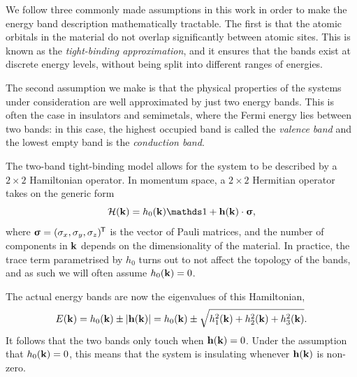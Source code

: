 We follow three commonly made assumptions in this work in order to make the energy band description mathematically tractable. The first is that the atomic orbitals in the material do not overlap significantly between atomic sites. This is known as the \emph{tight-binding approximation}, and it ensures that the bands exist at discrete energy levels, without being split into different ranges of energies.

The second assumption we make is that the physical properties of the systems under consideration are well approximated by just two energy bands. This is often the case in insulators and semimetals, where the Fermi energy lies between two bands: in this case, the highest occupied band is called the \emph{valence band} and the lowest empty band is the \emph{conduction band}.

The two-band tight-binding model allows for the system to be described by a $2\times2$ Hamiltonian operator. In momentum space, a $2\times2$ Hermitian operator takes on the generic form
\begin{equation}\label{eq:Hamiltonian}
	\Hc(\k) = h_0(\k)\Id + \h(\k)\cdot\bm{\upsigma},
\end{equation}
where $\bm{\upsigma} = (\sigma_x,\sigma_y,\sigma_z)^{\mkern-1.5mu\mathsf{T}}$ is the vector of Pauli matrices, and the number of components in $\vb{k}$ depends on the dimensionality of the material. In practice, the trace term parametrised by $h_0$ turns out to not affect the topology of the bands, and as such we will often assume $h_0(\vb{k})=0$.

The actual energy bands are now the eigenvalues of this Hamiltonian,
\begin{equation*}
	E(\vb{k}) = h_0(\vb{k}) \pm \abs{\vb{h}(\vb{k})} = h_0(\vb{k}) \pm \sqrt{h_1^2(\vb{k}) + h_2^2(\vb{k}) + h_3^2(\vb{k})}.
\end{equation*}
It follows that the two bands only touch when $\vb{h}(\vb{k}) = 0$. Under the assumption that $h_0(\vb{k}) = 0$, this means that the system is insulating whenever $\vb{h}(\vb{k})$ is non-zero.

